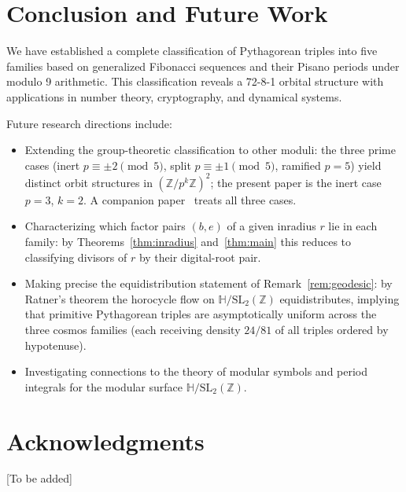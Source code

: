 \documentclass[12pt]{article}
\begin{document}
\section{Conclusion and Future Work}

We have established a complete classification of Pythagorean triples into five families based on generalized Fibonacci sequences and their Pisano periods under modulo 9 arithmetic. This classification reveals a 72-8-1 orbital structure with applications in number theory, cryptography, and dynamical systems.

Future research directions include:
\begin{itemize}
\item Extending the group-theoretic classification to other moduli: the three prime cases
  (inert $p\equiv\pm2\pmod5$, split $p\equiv\pm1\pmod5$, ramified $p=5$) yield distinct
  orbit structures in $(\mathbb{Z}/p^k\mathbb{Z})^2$; the present paper is the inert case
  $p=3$, $k=2$.  A companion paper~\cite{modular-dynamics} treats all three cases.
\item Characterizing which factor pairs $(b,e)$ of a given inradius $r$ lie in each
  family: by Theorems~\ref{thm:inradius} and~\ref{thm:main} this reduces to classifying
  divisors of $r$ by their digital-root pair.
\item Making precise the equidistribution statement of Remark~\ref{rem:geodesic}:
  by Ratner's theorem the horocycle flow on $\mathbb{H}/\mathrm{SL}_2(\mathbb{Z})$
  equidistributes, implying that primitive Pythagorean triples are asymptotically
  uniform across the three cosmos families (each receiving density $24/81$ of all
  triples ordered by hypotenuse).
\item Investigating connections to the theory of modular symbols and period integrals
  for the modular surface $\mathbb{H}/\mathrm{SL}_2(\mathbb{Z})$.
\end{itemize}

\section*{Acknowledgments}

[To be added]
\end{document}
